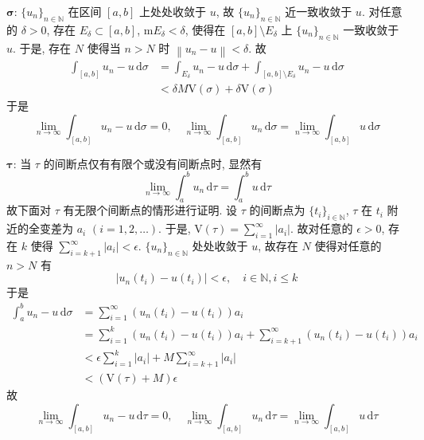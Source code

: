 \documentclass[\ROOT/main.tex]{subfiles}
\begin{document}
\noindent $\mathbf{\sigma}$:
$\{ u_{n} \}_{n \in \mathbb{N}}$ 在区间 $[a, b]$ 上处处收敛于 $u$,
故 $\{ u_{n} \}_{n \in \mathbb{N}}$ 近一致收敛于 $u$.
对任意的 $\delta > 0$, 存在 $E_\delta \subset [a, b]$, $\mathrm{m} E_\delta < \delta$,
使得在 $[a, b] \setminus E_\delta$ 上 $\{ u_{n} \}_{n \in \mathbb{N}}$ 一致收敛于 $u$.
于是, 存在 $N$ 使得当 $n > N$ 时 $\left\| u_n - u \right\| < \delta$.
故
\begin{align*}
    \int_{[a, b]} u_n - u \, \mathrm{d} \sigma
    &= \int_{E_\delta} u_n - u \, \mathrm{d} \sigma
        + \int_{[a, b] \setminus E_\delta} u_n - u \, \mathrm{d} \sigma \\
    &< \delta M \mathrm{V} \left( \sigma \right) + \delta \mathrm{V} \left( \sigma \right)
\end{align*}
于是
\[
    \lim_{n \to \infty} \int_{[a, b]} u_n - u \, \mathrm{d} \sigma = 0
    , \quad
    \lim_{n \to \infty} \int_{[a, b]} u_n \, \mathrm{d} \sigma 
    = \lim_{n \to \infty} \int_{[a, b]} u \, \mathrm{d} \sigma
\]

\noindent $\mathbf{\tau}$:
当 $\tau$ 的间断点仅有有限个或没有间断点时, 显然有
\[
    \lim_{n \to \infty} \int_{a}^{b} u_n \, \mathrm{d} \tau = \int_{a}^{b} u \, \mathrm{d} \tau
\]
故下面对 $\tau$ 有无限个间断点的情形进行证明.
设 $\tau$ 的间断点为 $\{ t_{i} \}_{i \in \mathbb{N}}$,
$\tau$ 在 $t_i$ 附近的全变差为 $a_i$ $\left( i = 1, 2, \dots \right)$.
于是, $\mathrm{V} \left( \tau \right) = \sum_{i = 1}^{\infty} \left| a_i \right|$.
故对任意的 $\epsilon > 0$, 存在 $k$ 使得 $\sum_{i = k + 1}^{\infty} \left| a_i \right| < \epsilon$.
$\{ u_{n} \}_{n \in \mathbb{N}}$ 处处收敛于 $u$, 故存在 $N$ 使得对任意的 $n > N$ 有
\[
    \left| u_n \left( t_i \right) - u \left( t_i \right) \right| < \epsilon
    , \quad i \in \mathbb{N}, i \leqslant k
\]
于是
\begin{align*}
    \int_{a}^{b} u_n - u \, \mathrm{d} \sigma
    &= \sum_{i = 1}^{\infty}\left( u_n \left( t_i \right) - u \left( t_i \right) \right) a_i \\
    &= \sum_{i = 1}^{k}\left( u_n \left( t_i \right) - u \left( t_i \right) \right) a_i
        + \sum_{i = k + 1}^{\infty}\left( u_n \left( t_i \right) - u \left( t_i \right) \right) a_i \\
    &< \epsilon \sum_{i = 1}^{k} \left| a_i \right| + M \sum_{i = k + 1}^{\infty} \left| a_i \right| \\
    &< \left( \mathrm{V} \left( \tau \right) + M \right) \epsilon
\end{align*}
故
\[
    \lim_{n \to \infty} \int_{[a, b]} u_n - u \, \mathrm{d} \tau = 0
    , \quad
    \lim_{n \to \infty} \int_{[a, b]} u_n \, \mathrm{d} \tau 
    = \lim_{n \to \infty} \int_{[a, b]} u \, \mathrm{d} \tau
\]
\end{document}
